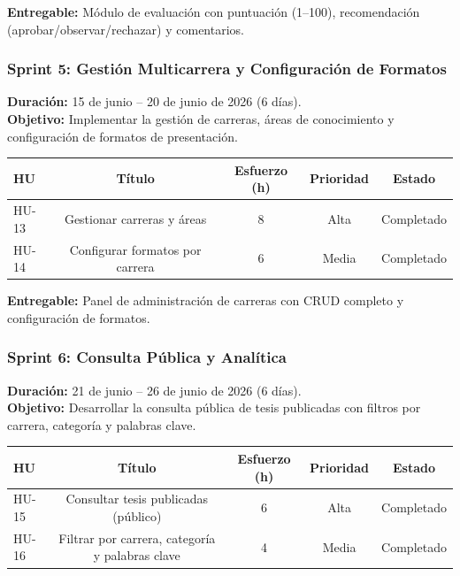 \textbf{Entregable:} Módulo de evaluación con puntuación (1--100), recomendación (aprobar/observar/rechazar) y comentarios.

\subsubsection{Sprint 5: Gestión Multicarrera y Configuración de Formatos}
\label{sprint:5}

\textbf{Duración:} 15 de junio – 20 de junio de 2026 (6 días). \\
\textbf{Objetivo:} Implementar la gestión de carreras, áreas de conocimiento y configuración de formatos de presentación.

\begin{center}
\begin{tabular}{lcccc}
\toprule
\textbf{HU} & \textbf{Título} & \textbf{Esfuerzo (h)} & \textbf{Prioridad} & \textbf{Estado} \\
\midrule
HU-13 & Gestionar carreras y áreas & 8 & Alta & Completado \\
HU-14 & Configurar formatos por carrera & 6 & Media & Completado \\
\bottomrule
\end{tabular}
\end{center}

\textbf{Entregable:} Panel de administración de carreras con CRUD completo y configuración de formatos.

\subsubsection{Sprint 6: Consulta Pública y Analítica}
\label{sprint:6}

\textbf{Duración:} 21 de junio – 26 de junio de 2026 (6 días). \\
\textbf{Objetivo:} Desarrollar la consulta pública de tesis publicadas con filtros por carrera, categoría y palabras clave.

\begin{center}
\begin{tabular}{lcccc}
\toprule
\textbf{HU} & \textbf{Título} & \textbf{Esfuerzo (h)} & \textbf{Prioridad} & \textbf{Estado} \\
\midrule
HU-15 & Consultar tesis publicadas (público) & 6 & Alta & Completado \\
HU-16 & Filtrar por carrera, categoría y palabras clave & 4 & Media & Completado \\
\bottomrule
\end{tabular}
\end{center}

